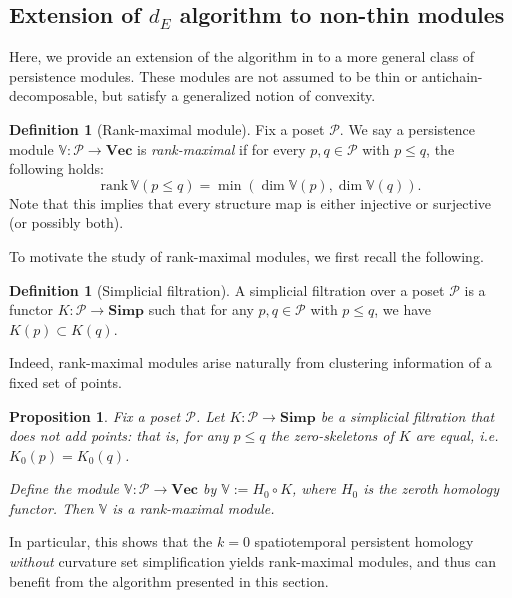 \documentclass[a4paper,UKenglish,thm-restate]{article}
\newtheorem{proposition}[theorem]{Proposition}
\theoremstyle{definition}
\newtheorem{definition}[theorem]{Definition}
\def\bbv{\mathbb{V}}
\def\bvec{\mathbf{Vec}}
\def\bsimp{\mathbf{Simp}}
\begin{document}
        \subsection{Extension of $d_E$ algorithm to non-thin modules} \label{sect:dealgoextension}
            Here, we provide an extension of the algorithm in  to a more general class of persistence modules. These modules are not assumed to be thin or antichain-decomposable, but satisfy a generalized notion of convexity.
            \begin{definition}[Rank-maximal module] \label{def:rankmaximal}
                Fix a poset $\mathcal{P}$. We say a persistence module $\bbv: \mathcal{P} \rightarrow \bvec$ is \emph{rank-maximal} if for every $p, q \in \mathcal{P}$ with $p \leq q$, the following holds: 
                \[\mathrm{rank}\, \bbv(p \leq q) = \min{(\dim \bbv(p), \dim \bbv(q))}.\]
                Note that this implies that every structure map is either injective or surjective (or possibly both).
            \end{definition}
            To motivate the study of rank-maximal modules, we first recall the following.
            \begin{definition}[Simplicial filtration]
                A simplicial filtration over a poset $\mathcal{P}$ is a functor $K: \mathcal{P} \rightarrow \bsimp$ such that for any $p, q \in \mathcal{P}$ with $p \leq q$, we have $K(p) \subset K(q)$.
            \end{definition}
            Indeed, rank-maximal modules arise naturally from clustering information of a fixed set of points.
            \begin{proposition}
                 Fix a poset $\mathcal{P}$. Let $K: \mathcal{P} \rightarrow \bsimp$ be a simplicial filtration that does not add points: that is, for any $p \leq q$ the zero-skeletons of $K$ are equal, i.e. $K_0(p) = K_0(q)$.
                
                Define the module $\bbv: \mathcal{P} \rightarrow \bvec$ by $\bbv := H_0 \circ K$, where $H_0$ is the zeroth homology functor. Then $\bbv$ is a rank-maximal module.
            \end{proposition}
            In particular, this shows that the $k=0$ spatiotemporal persistent homology \cite{spatiotemporal} \emph{without} curvature set simplification yields rank-maximal modules, and thus can benefit from the algorithm presented in this section.
\end{document}
